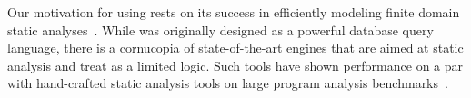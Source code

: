 
Our motivation for using \Datalog rests on its success in efficiently modeling
finite domain static analyses~\cite{doop}. While \Datalog was originally designed 
as a powerful database query language, there is a cornucopia of state-of-the-art \Datalog 
engines that are aimed at static analysis and treat \Datalog as a limited logic. Such tools 
have shown performance on a par with hand-crafted static analysis tools on large program 
analysis benchmarks~\cite{souffle}.


